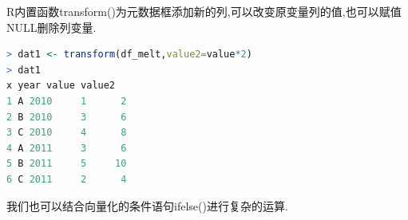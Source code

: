 \documentclass[11pt,a4paper,oneside]{book}
\begin{document}
R内置函数transform()为元数据框添加新的列,可以改变原变量列的值,也可以赋值NULL删除列变量.
\begin{lstlisting}[language=r]
> dat1 <- transform(df_melt,value2=value*2)
> dat1
x year value value2
1 A 2010     1      2
2 B 2010     3      6
3 C 2010     4      8
4 A 2011     3      6
5 B 2011     5     10
6 C 2011     2      4
\end{lstlisting}

我们也可以结合向量化的条件语句ifelse()进行复杂的运算.
\begin{lstlisting}[language=r]
	
\end{lstlisting}
\begin{lstlisting}[language=r]
	
\end{lstlisting}
\end{document}
